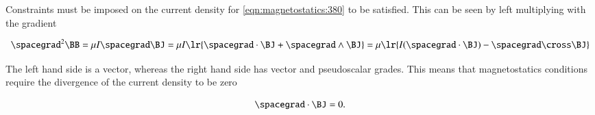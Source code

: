 Constraints must be imposed on the current density for \cref{eqn:magnetostatics:380} to be satisfied.
This can be seen by left multiplying with the gradient

\begin{dmath}\label{eqn:magnetostatics:440}
\spacegrad^2 \BB
= \mu I \spacegrad \BJ
= \mu I \lr{ \spacegrad \cdot \BJ + \spacegrad \wedge \BJ }
= \mu \lr{ I (\spacegrad \cdot \BJ) - \spacegrad \cross \BJ }
\end{dmath}

The left hand side is a vector, whereas the right hand side has vector and pseudoscalar grades.
This means that magnetostatics conditions require the divergence of the current density to be zero

\begin{dmath}\label{eqn:magnetostatics:460}
\spacegrad \cdot \BJ = 0.
\end{dmath}

